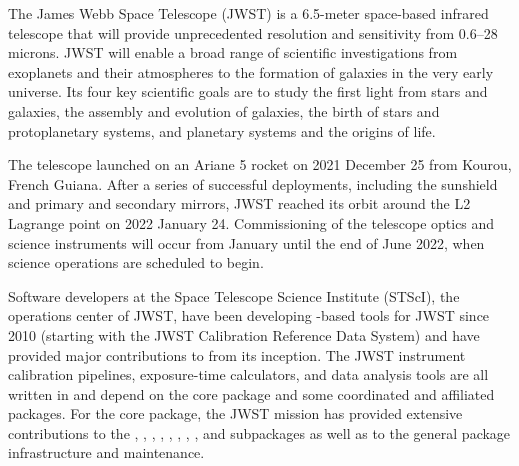 \documentclass[modern]{aastex631}
\begin{document}
The James Webb Space Telescope (JWST) is a 6.5-meter space-based
infrared telescope that will provide unprecedented resolution and
sensitivity from 0.6--28 microns. JWST will enable a broad range
of scientific investigations from exoplanets and their atmospheres
to the formation of galaxies in the very early universe. Its four
key scientific goals are to study the first light from stars and
galaxies, the assembly and evolution of galaxies, the birth of stars and
protoplanetary systems, and planetary systems and the origins of life.

The telescope launched on an Ariane 5 rocket on 2021 December 25 from
Kourou, French Guiana. After a series of successful deployments,
including the sunshield and primary and secondary mirrors, JWST reached
its orbit around the L2 Lagrange point on 2022 January 24. Commissioning
of the telescope optics and science instruments will occur from January
until the end of June 2022, when science operations are scheduled to
begin.

Software developers at the Space Telescope Science Institute (STScI),
the operations center of JWST, have been developing \python-based tools
for JWST since 2010 (starting with the JWST Calibration Reference Data
System) and have provided major contributions to \astropy from its
inception. The JWST instrument calibration pipelines, exposure-time
calculators, and data analysis tools are all written in \python and
depend on the \astropypkg core package and some coordinated and
affiliated packages. For the \astropypkg core package, the JWST mission
has provided extensive contributions to the ,
, , ,
, ,
, , and
 subpackages as well as to the general
package infrastructure and maintenance.
\end{document}

